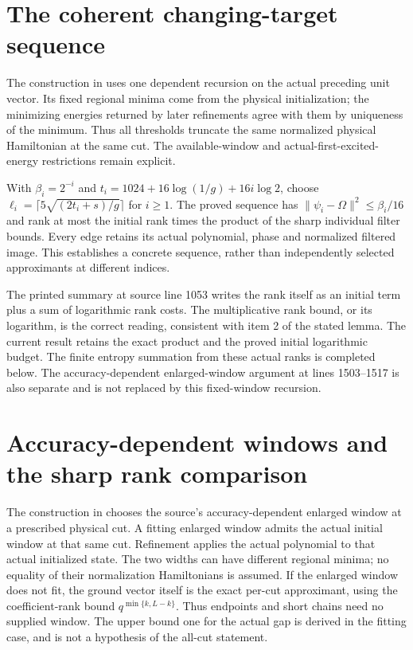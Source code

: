 \documentclass{article}
\begin{document}
\section{The coherent changing-target sequence}

The construction in 
uses one dependent recursion on the actual preceding unit vector. Its
fixed regional minima come from the physical initialization; the minimizing
energies returned by later refinements agree with them by uniqueness of
the minimum. Thus all thresholds truncate the same normalized physical
Hamiltonian at the same cut. The available-window and actual-first-excited-
energy restrictions remain explicit.

With $\beta_i=2^{-i}$ and
$t_i=1024+16\log(1/g)+16i\log2$, choose
$\ell_i=\lceil5\sqrt{(2t_i+s)/g}\rceil$ for $i\ge1$.
The proved sequence has $\|\psi_i-\Omega\|^2\le\beta_i/16$ and
rank at most the initial rank times the product of the sharp individual
filter bounds. Every edge retains its actual polynomial, phase and
normalized filtered image. This establishes a concrete sequence, rather
than independently selected approximants at different indices.

The printed summary at source line 1053 writes the rank itself as an
initial term plus a sum of logarithmic rank costs. The multiplicative
rank bound, or its logarithm, is the correct reading, consistent with
item 2 of the stated lemma. The current result retains the exact product
and the proved initial logarithmic budget. The finite entropy summation
from these actual ranks is completed below.
The accuracy-dependent enlarged-window argument at lines 1503--1517 is
also separate and is not replaced by this fixed-window recursion.

\section{Accuracy-dependent windows and the sharp rank comparison}

The construction in 
chooses the source's accuracy-dependent enlarged window at a prescribed
physical cut. A fitting enlarged window admits the actual initial window
at that same cut. Refinement applies the actual polynomial to that actual
initialized state. The two widths can have different regional minima;
no equality of their normalization Hamiltonians is assumed.
If the enlarged window does not fit, the ground vector itself is the
exact per-cut approximant, using the coefficient-rank bound
$q^{\min\{k,L-k\}}$. Thus endpoints and short chains need no supplied window.
The upper bound one for the actual gap is derived in the fitting case,
and is not a hypothesis of the all-cut statement.
\end{document}
